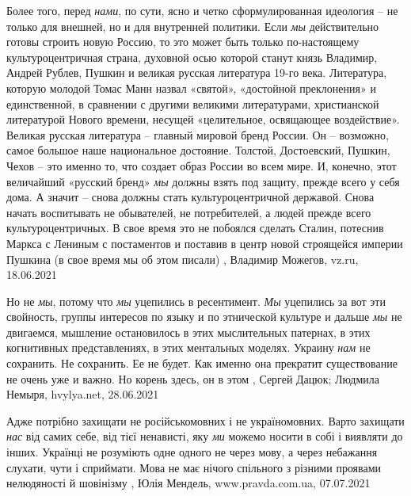 Более того, перед \emph{нами}, по сути, ясно и четко сформулированная идеология – не
только для внешней, но и для внутренней политики. Если \emph{мы} действительно готовы
строить новую Россию, то это может быть только по-настоящему культуроцентричная
страна, духовной осью которой станут князь Владимир, Андрей Рублев, Пушкин и
великая русская литература 19-го века. Литература, которую молодой Томас Манн
назвал «святой», «достойной преклонения» и единственной, в сравнении с другими
великими литературами, христианской литературой Нового времени, несущей
«целительное, освящающее воздействие».  Великая русская литература – главный
мировой бренд России. Он – возможно, самое большое наше национальное достояние.
Толстой, Достоевский, Пушкин, Чехов – это именно то, что создает образ России
во всем мире. И, конечно, этот величайший «русский бренд» \emph{мы} должны взять под
защиту, прежде всего у себя дома. А значит – снова должны стать
культуроцентричной державой. Снова начать воспитывать не обывателей, не
потребителей, а людей прежде всего культуроцентричных. В свое время это не
побоялся сделать Сталин, потеснив Маркса с Лениным с постаментов и поставив в
центр новой строящейся империи Пушкина (в свое время мы об этом писали)
, 
Владимир Можегов, vz.ru, 18.06.2021

Но не \emph{мы}, потому что \emph{мы} уцепились в ресентимент. \emph{Мы} уцепились за вот эти
свойность, группы интересов по языку и по этнической культуре и дальше \emph{мы} не
двигаемся, мышление остановилось в этих мыслительных патернах, в этих
когнитивных представлениях, в этих ментальных моделях. Украину \emph{нам} не
сохранить. Не сохранить. Ее не будет. Как именно она прекратит существование не
очень уже и важно. Но корень здесь, он в этом
, 
Сергей Дацюк; Людмила Немыря, hvylya.net, 28.06.2021

Адже потрібно захищати не російськомовних і не україномовних. Варто захищати
\emph{нас} від самих себе, від тієї ненависті, яку \emph{ми} можемо носити в
собі і виявляти до інших. Українці не розуміють одне одного не через мову, а
через небажання слухати, чути і сприймати.  Мова не має нічого спільного з
різними проявами нелюдяності й шовінізму
, 
Юлія Мендель, www.pravda.com.ua, 07.07.2021

